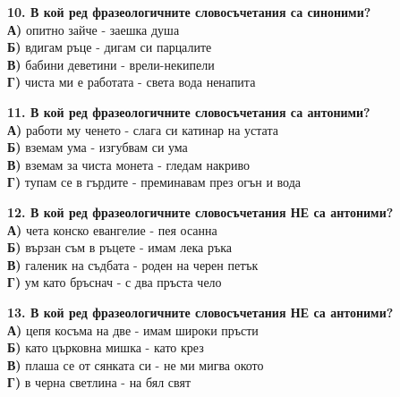 \documentclass[12pt,a4paper]{article}
\begin{document}
\vspace{0.6cm}

\noindent
\textbf{10. В кой ред фразеологичните словосъчетания са синоними?} \\
\noindent
\textbf{А)} опитно зайче - заешка душа \\
\textbf{Б)} вдигам ръце - дигам си парцалите \\
\textbf{В)} бабини деветини - врели-некипели \\
\textbf{Г)} чиста ми е работата - света вода ненапита

\vspace{0.6cm}

\noindent
\textbf{11. В кой ред фразеологичните словосъчетания са антоними?} \\
\noindent
\textbf{А)} работи му ченето - слага си катинар на устата \\
\textbf{Б)} вземам ума - изгубвам си ума \\
\textbf{В)} вземам за чиста монета - гледам накриво \\
\textbf{Г)} тупам се в гърдите - преминавам през огън и вода

\vspace{0.6cm}

\noindent
\textbf{12. В кой ред фразеологичните словосъчетания НЕ са антоними?} \\
\noindent
\textbf{А)} чета конско евангелие - пея осанна \\
\textbf{Б)} вързан съм в ръцете - имам лека ръка \\
\textbf{В)} галеник на съдбата - роден на черен петък \\
\textbf{Г)} ум като бръснач - с два пръста чело

\vspace{0.6cm}

\noindent
\textbf{13. В кой ред фразеологичните словосъчетания НЕ са антоними?} \\
\noindent
\textbf{А)} цепя косъма на две - имам широки пръсти \\
\textbf{Б)} като църковна мишка - като крез \\
\textbf{В)} плаша се от сянката си - не ми мигва окото \\
\textbf{Г)} в черна светлина - на бял свят

\vspace{0.8cm}
\end{document}
